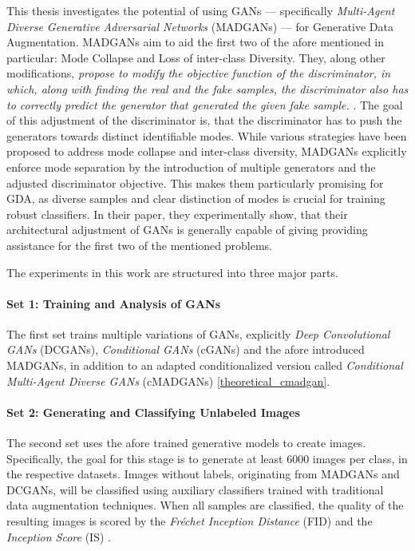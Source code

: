 This thesis investigates the potential of using GANs --- specifically \textit{Multi-Agent Diverse Generative Adversarial Networks} (MADGANs) \cite{ghosh2018madgan} --- for Generative Data Augmentation. MADGANs aim to aid the first two of the afore mentioned in particular: Mode Collapse and Loss of inter-class Diversity. They, along other modifications, \textit{propose to modify the objective function of the discriminator, in which, along with finding the real and the fake samples, the discriminator also has to correctly predict the generator that generated the given fake sample.} \cite{ghosh2018madgan}. The goal of this adjustment of the discriminator is, that the discriminator has to push the generators towards distinct identifiable modes. While various strategies have been proposed to address mode collapse and inter-class diversity, MADGANs explicitly enforce mode separation by the introduction of multiple generators and the adjusted discriminator objective. This makes them particularly promising for GDA, as diverse samples and clear distinction of modes is crucial for training robust classifiers. In their paper, they experimentally show, that their architectural adjustment of GANs is generally capable of giving providing assistance for the first two of the mentioned problems.

The experiments in this work are structured into three major parts.

\paragraph{Set 1: Training and Analysis of GANs}  \label{thesis_goal_1}
The first set trains multiple variations of GANs, explicitly \textit{Deep Convolutional GANs} (DCGANs), \textit{Conditional GANs} (cGANs) and the afore introduced MADGANs, in addition to an adapted conditionalized version called \textit{Conditional Multi-Agent Diverse GANs} (cMADGANs) \ref{theoretical_cmadgan}. 

\paragraph{Set 2: Generating and Classifying Unlabeled Images}  \label{thesis_goal_2}
The second set uses the afore trained generative models to create images. Specifically, the goal for this stage is to generate at least $6 000$ images per class, in the respective datasets. Images without labels, originating from MADGANs and DCGANs, will be classified using auxiliary classifiers trained with traditional data augmentation techniques. When all samples are classified, the quality of the resulting images is scored by the \textit{Fréchet Inception Distance} (FID) \cite{heusel2018ganstrainedtimescaleupdate} and the \textit{Inception Score} (IS) \cite{salimans2016improvedtechniquestraininggans}.

